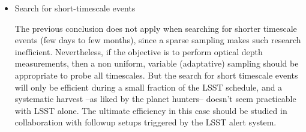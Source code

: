 \begin{itemize}
    \item Search for short-timescale events
    
    The previous conclusion does not apply when searching for shorter timescale events (few days to few months), since a sparse sampling makes such research inefficient. Nevertheless, if the objective is to perform optical depth measurements, then a non uniform, variable (adaptative) sampling should be appropriate to probe all timescales. But the search for short timescale events will only be efficient during a small fraction of the LSST schedule, and a systematic harvest --as liked by the planet hunters-- doesn't seem practicable with LSST alone. The ultimate efficiency in this case should be studied in collaboration with followup setups triggered by the LSST alert system.
    \end{itemize}  
